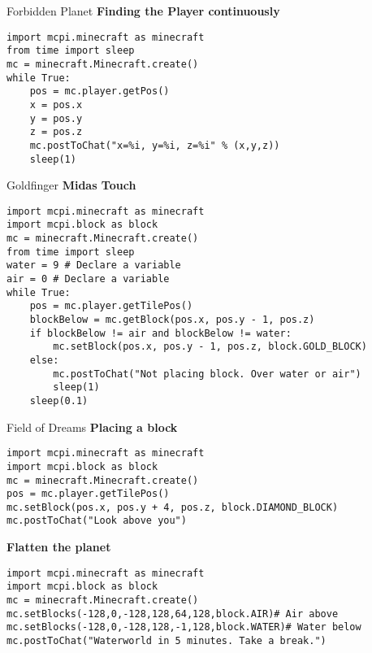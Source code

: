 \documentclass[flashcard_land,grid]{flashcards}
\begin{document}
\begin{flashcard}[API]{Forbidden Planet}
{\bf Finding the Player continuously}
\begin{lstlisting}
import mcpi.minecraft as minecraft
from time import sleep
mc = minecraft.Minecraft.create()
while True:
    pos = mc.player.getPos()
    x = pos.x
    y = pos.y
    z = pos.z
    mc.postToChat("x=%i, y=%i, z=%i" % (x,y,z))
    sleep(1)
\end{lstlisting}
\end{flashcard}


\begin{flashcard}[API]{Goldfinger}
{\bf Midas Touch}
\begin{lstlisting}
import mcpi.minecraft as minecraft
import mcpi.block as block
mc = minecraft.Minecraft.create()
from time import sleep
water = 9 # Declare a variable
air = 0 # Declare a variable
while True:
    pos = mc.player.getTilePos()
    blockBelow = mc.getBlock(pos.x, pos.y - 1, pos.z)
    if blockBelow != air and blockBelow != water:
        mc.setBlock(pos.x, pos.y - 1, pos.z, block.GOLD_BLOCK)
    else:
        mc.postToChat("Not placing block. Over water or air")
        sleep(1)
    sleep(0.1)
\end{lstlisting}
\end{flashcard}


\begin{flashcard}[API]{Field of Dreams}
{\bf Placing a block}
\begin{lstlisting}
import mcpi.minecraft as minecraft
import mcpi.block as block
mc = minecraft.Minecraft.create()
pos = mc.player.getTilePos()
mc.setBlock(pos.x, pos.y + 4, pos.z, block.DIAMOND_BLOCK)
mc.postToChat("Look above you")
\end{lstlisting}
{\bf Flatten the planet}
\begin{lstlisting}
import mcpi.minecraft as minecraft
import mcpi.block as block
mc = minecraft.Minecraft.create() 
mc.setBlocks(-128,0,-128,128,64,128,block.AIR)# Air above
mc.setBlocks(-128,0,-128,128,-1,128,block.WATER)# Water below
mc.postToChat("Waterworld in 5 minutes. Take a break.")
\end{lstlisting}
\end{flashcard}
\end{document}

